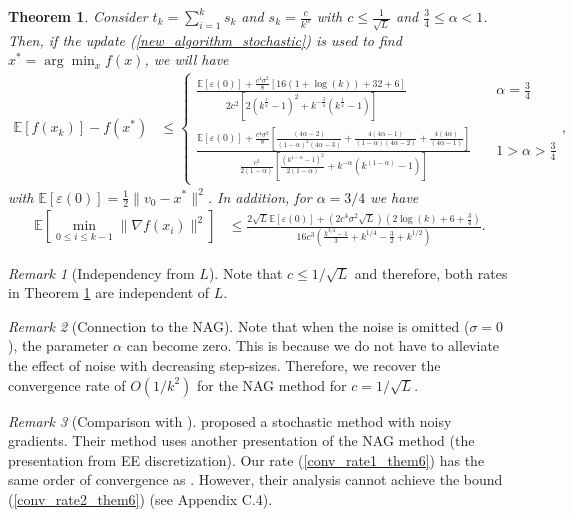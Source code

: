 \documentclass{article}
\theoremstyle{plain}
\newtheorem{theorem}{Theorem}[section]
\theoremstyle{definition}
\theoremstyle{remark}
\newtheorem{remark}{Remark}[theorem]
\begin{document}
\begin{theorem}\label{Theorem5}
    Consider $t_k=\sum_{i=1}^k s_k $ and $s_k=\frac{c}{k^{\alpha}}$ with $c\leq \frac{1}{\sqrt{L}}$ and $\frac{3}{4}\leq\alpha<1$. Then, if the update (\ref{new_algorithm_stochastic}) is used to find $x^*=\arg\min_x f(x)$, we will have
    \begin{align}\label{conv_rate1_them6}
    \mathbb E[f(x_k)]-f(x^*)&\leq \left\{\begin{array}{lr}
         \frac{\mathbb E[\varepsilon (0)]+\frac{c^4\sigma^2}{8}\left[16(1+\log(k))+32+6\right]}{2c^2\left[2(k^{\frac{1}{4}}-1)^2+k^{-\frac{3}{4}}(k^{\frac{1}{4}}-1)\right]} & \quad \alpha=\frac{3}{4} \\
          \frac{\mathbb E[\varepsilon (0)]+\frac{c^4\sigma^2}{8}\left[\frac{(4\alpha -2)}{(1-\alpha)^2(4\alpha-3)}+\frac{4(4\alpha -1)}{(1-\alpha)(4\alpha -2)}+\frac{4(4\alpha )}{(4\alpha -1)}\right]}{\frac{c^2}{2(1-\alpha)}\left[\frac{(k^{1-\alpha}-1)^2}{2(1-\alpha)}+k^{-\alpha}(k^{(1-\alpha)}-1)\right]}& \quad 1>\alpha>\frac{3}{4}
    \end{array}\right.,
\end{align}
with $\mathbb E[\varepsilon (0)]=\frac{1}{2}\|v_0-x^*\|^2$. In addition, for $\alpha = 3/4$ we have
\begin{align}\label{conv_rate2_them6}
    \mathbb E\left[\min_{0\leq i\leq k-1}\|\nabla f(x_i)\|^2 \right] &\leq \frac{2\sqrt{L}\mathbb E[\varepsilon (0)]+(2c^4\sigma^2\sqrt{L})(2\log (k)+6+\frac{3}{4})}{16c^3\left( \frac{k^{3/4}-1}{3} +k^{1/4}-\frac{3}{2}+k^{1/2}\right)}.
\end{align}
\end{theorem}
\begin{remark}[Independency from \(L\)]
Note that $c\leq 1/\sqrt{L}$ and therefore, both rates in Theorem \ref{Theorem5} are independent of $L$. 
\end{remark}
\begin{remark}[Connection to the NAG]
    Note that when the noise is omitted ($\sigma=0$), the parameter $\alpha$ can become zero. This is because we do not have to alleviate the effect of noise with decreasing step-sizes. Therefore, we recover the convergence rate of $O(1/k^2)$ for the NAG method for $c=1/\sqrt{L}$.
\end{remark}
\begin{remark}[Comparison with \citep{pmlr-v108-laborde20a}]
    \citep{pmlr-v108-laborde20a} proposed a stochastic method with noisy gradients. Their method uses another presentation of the NAG method (the presentation from EE discretization). Our rate (\ref{conv_rate1_them6}) has the same order of convergence as \citep{pmlr-v108-laborde20a}. However, their analysis cannot achieve the bound (\ref{conv_rate2_them6}) (see \citep{pmlr-v108-laborde20a} Appendix C.4).
\end{remark}
\end{document}

